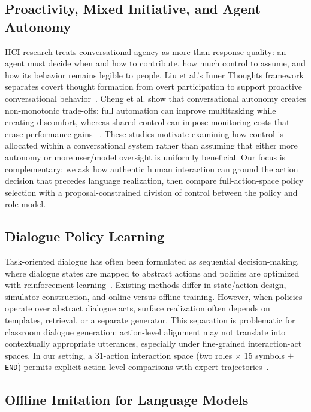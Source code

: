 \documentclass[manuscript,review,anonymous]{acmart}
\begin{document}
\subsection{Proactivity, Mixed Initiative, and Agent Autonomy}

HCI research treats conversational agency as more than response quality: an
agent must decide when and how to contribute, how much control to assume, and
how its behavior remains legible to people. Liu et al.'s Inner Thoughts
framework separates covert thought formation from overt participation to
support proactive conversational behavior~\citep{liu2025proactive}. Cheng et
al. show that conversational autonomy creates non-monotonic trade-offs: full
automation can improve multitasking while creating discomfort, whereas shared
control can impose monitoring costs that erase performance gains
~\citep{cheng2025surrogates}. These studies motivate examining how control is
allocated within a conversational system rather than assuming that either
more autonomy or more user/model oversight is uniformly beneficial. Our focus
is complementary: we ask how authentic human interaction can ground the action
decision that precedes language realization, then compare full-action-space
policy selection with a proposal-constrained division of control between the
policy and role model.

\subsection{Dialogue Policy Learning}

Task-oriented dialogue has often been formulated as sequential decision-making, where dialogue states are mapped to abstract actions and policies are optimized with reinforcement learning~\citep{li2016deep, li2018dialogue}.
Existing methods differ in state/action design, simulator construction, and online versus offline training.
However, when policies operate over abstract dialogue acts, surface realization often depends on templates, retrieval, or a separate generator.
This separation is problematic for classroom dialogue generation: action-level alignment may not translate into contextually appropriate utterances, especially under fine-grained interaction-act spaces.
In our setting, a 31-action interaction space (two roles $\times$ 15 symbols $+$ \texttt{END}) permits explicit action-level comparisons with expert trajectories~\citep{songyu79, amatari2015}.

\subsection{Offline Imitation for Language Models}
\end{document}

